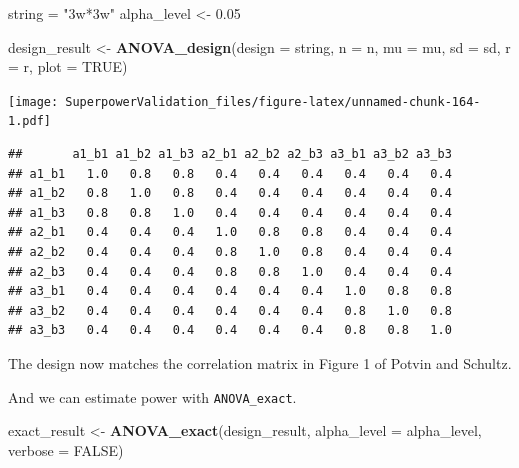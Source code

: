 \documentclass[]{book}
\newenvironment{Shaded}{\begin{snugshade}}{\end{snugshade}}
\newcommand{\DataTypeTok}[1]{\textcolor[rgb]{0.13,0.29,0.53}{#1}}
\newcommand{\FloatTok}[1]{\textcolor[rgb]{0.00,0.00,0.81}{#1}}
\newcommand{\KeywordTok}[1]{\textcolor[rgb]{0.13,0.29,0.53}{\textbf{#1}}}
\newcommand{\NormalTok}[1]{#1}
\newcommand{\OperatorTok}[1]{\textcolor[rgb]{0.81,0.36,0.00}{\textbf{#1}}}
\newcommand{\OtherTok}[1]{\textcolor[rgb]{0.56,0.35,0.01}{#1}}
\newcommand{\StringTok}[1]{\textcolor[rgb]{0.31,0.60,0.02}{#1}}
\begin{document}
\begin{Shaded}
\begin{Highlighting}[]
\NormalTok{string =}\StringTok{ "3w*3w"}
\NormalTok{alpha_level <-}\StringTok{ }\FloatTok{0.05}

\NormalTok{design_result <-}\StringTok{ }\KeywordTok{ANOVA_design}\NormalTok{(}\DataTypeTok{design =}\NormalTok{ string,}
                              \DataTypeTok{n =}\NormalTok{ n, }
                              \DataTypeTok{mu =}\NormalTok{ mu, }
                              \DataTypeTok{sd =}\NormalTok{ sd, }
                              \DataTypeTok{r =}\NormalTok{ r, }
                              \DataTypeTok{plot =} \OtherTok{TRUE}\NormalTok{)}
\end{Highlighting}
\end{Shaded}

\texttt{[image: SuperpowerValidation\_files/figure-latex/unnamed-chunk-164-1.pdf]}

\begin{Shaded}
\end{Shaded}

\begin{verbatim}
##       a1_b1 a1_b2 a1_b3 a2_b1 a2_b2 a2_b3 a3_b1 a3_b2 a3_b3
## a1_b1   1.0   0.8   0.8   0.4   0.4   0.4   0.4   0.4   0.4
## a1_b2   0.8   1.0   0.8   0.4   0.4   0.4   0.4   0.4   0.4
## a1_b3   0.8   0.8   1.0   0.4   0.4   0.4   0.4   0.4   0.4
## a2_b1   0.4   0.4   0.4   1.0   0.8   0.8   0.4   0.4   0.4
## a2_b2   0.4   0.4   0.4   0.8   1.0   0.8   0.4   0.4   0.4
## a2_b3   0.4   0.4   0.4   0.8   0.8   1.0   0.4   0.4   0.4
## a3_b1   0.4   0.4   0.4   0.4   0.4   0.4   1.0   0.8   0.8
## a3_b2   0.4   0.4   0.4   0.4   0.4   0.4   0.8   1.0   0.8
## a3_b3   0.4   0.4   0.4   0.4   0.4   0.4   0.8   0.8   1.0
\end{verbatim}

The design now matches the correlation matrix in Figure 1 of Potvin and Schultz.

And we can estimate power with \texttt{ANOVA\_exact}.

\begin{Shaded}
\begin{Highlighting}[]
\NormalTok{exact_result <-}\StringTok{ }\KeywordTok{ANOVA_exact}\NormalTok{(design_result,}
                            \DataTypeTok{alpha_level =}\NormalTok{ alpha_level,}
                            \DataTypeTok{verbose =} \OtherTok{FALSE}\NormalTok{)}
\end{Highlighting}
\end{Shaded}
\end{document}
